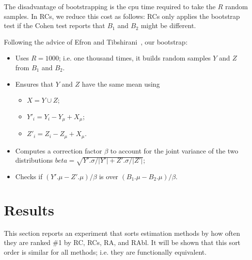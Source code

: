 \documentclass{sig-alternate}
\newcommand{\bi}{\begin{itemize}}
\newcommand{\ei}{\end{itemize}}
\begin{document}
The  disadvantage of bootstrapping is the cpu time required to take the $R$
random samples. In RCs, we reduce this cost as follows: RCs only
applies the bootstrap test if the Cohen test reports that $B_1$ and
$B_2$ might be different.

Following the advice of Efron and Tibshirani~\cite{efron93},
our bootstrap:
\bi
\item Uses $R=1000$; i.e. one thousand times, it builds random samples $Y$ and $Z$ from $B_1$ and $B_2$.
\item Ensures that $Y$ and $Z$ have the same mean using
\bi
\item $X=Y \cup Z$; 
\item $Y'_i = Y_i - Y_\mu + X_\mu$; 
\item $Z'_i = Z_i - Z_\mu + X_\mu$.
\ei
\item Computes a correction factor $\beta$ to 
 account for the joint variance of the two 
distributions $beta= \sqrt{Y'.\sigma/|Y'| + Z'.\sigma/|Z'|}$;
\item 
Checks if $(Y'.\mu - Z'.\mu)/\beta$ is over $(B_1.\mu - B_2.\mu)/\beta$.
\ei





\section{Results}\label{sect:results}

This section reports an experiment that sorts estimation  methods by how often they are ranked \#1 by
  RC, RCs, RA, and RAbl. 
It will be shown that this sort order is similar for all methods; i.e. they are functionally equivalent.
\end{document}
